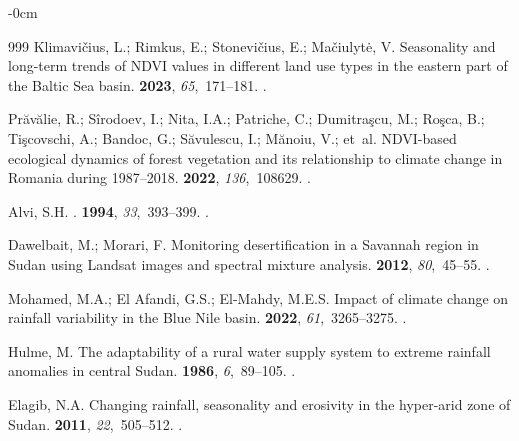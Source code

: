 \documentclass[jimaging,article,accept,pdftex,moreauthors]{Definitions/mdpi}
\begin{document}
\begin{adjustwidth}{-\extralength}{0cm}
\begin{thebibliography}{999}
Klimavičius, L.; Rimkus, E.; Stonevičius, E.; Mačiulytė, V.
\newblock Seasonality and long-term trends of NDVI values in different land use
  types in the eastern part of the Baltic Sea basin.
 {\bf 2023}, {\em 65},~171--181.
.

Prăvălie, R.; Sîrodoev, I.; Nita, I.A.; Patriche, C.; Dumitraşcu, M.;
  Roşca, B.; Tişcovschi, A.; Bandoc, G.; Săvulescu, I.; Mănoiu, V.;  et~al.
\newblock NDVI-based ecological dynamics of forest vegetation and its
  relationship to climate change in Romania during 1987--2018.
 {\bf 2022}, {\em 136},~108629.
.

Alvi, S.H.
.
 {\bf 1994}, {\em 33},~393--399.
.

Dawelbait, M.; Morari, F.
\newblock Monitoring desertification in a Savannah region in Sudan using
  Landsat images and spectral mixture analysis.
 {\bf 2012}, {\em 80},~45--55.
.

Mohamed, M.A.; {El Afandi}, G.S.; El-Mahdy, M.E.S.
\newblock Impact of climate change on rainfall variability in the Blue Nile
  basin.
 {\bf 2022}, {\em
  61},~3265--3275.
.

Hulme, M.
\newblock The adaptability of a rural water supply system to extreme rainfall
  anomalies in central Sudan.
 {\bf 1986}, {\em 6},~89--105.
.

Elagib, N.A.
\newblock Changing rainfall, seasonality and erosivity in the hyper-arid zone
  of Sudan.
 {\bf 2011}, {\em 22},~505--512.
.


\end{thebibliography}
\end{adjustwidth}
\end{document}
